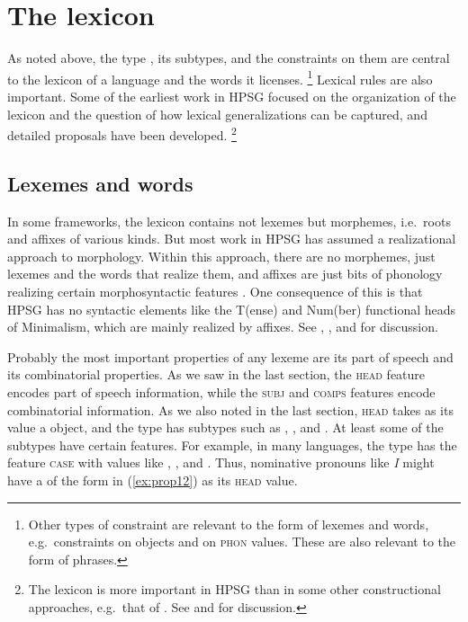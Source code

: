 \documentclass[output=paper
	        ,collection
	        ,collectionchapter
 	        ,biblatex
                ,babelshorthands
                ,newtxmath
                ,draftmode
                ,colorlinks, citecolor=brown
]{langscibook}
\begin{document}
\section{The lexicon}\label{sec:prop4}
\label{prop:sec-lexicon}

As noted above, the type , its subtypes, and the constraints on them are central to the lexicon of a language and the words it licenses.%
%
\footnote{\label{fn-constraints-synsem-phon}%
Other types of constraint are relevant to the form of lexemes and words, e.g.\ constraints on  objects and on \textsc{phon} values. These are also relevant to the form of phrases.}
%
Lexical rules are also important. Some of the earliest work in HPSG focused on the organization of the lexicon and the question of how lexical generalizations can be captured, and detailed proposals have been developed.%
%
\footnote{The lexicon is more important in HPSG than in some other constructional approaches, e.g.\ that of \citet{Goldberg95a,Goldberg2006a}. See \citet{MWArgSt} and  for discussion.}
%

\subsection{Lexemes and words}\label{sec:prop4.1}

In some frameworks, the lexicon contains not lexemes but morphemes, i.e.\ roots and affixes of various kinds. But most work in HPSG has assumed a realizational approach to morphology. Within this approach, there are no morphemes, just lexemes and the words that realize them, and affixes are just bits of phonology realizing certain morphosyntactic features \citep{Stump2001a-u-kopiert,Anderson92a-u}. One consequence of this is that HPSG has no syntactic elements like the T(ense) and Num(ber) functional heads of Minimalism\indexmp, which are mainly realized by affixes. See , , and  for discussion.

Probably the most important properties of any lexeme are its part of speech and its combinatorial properties. As we saw in the last section, the \textsc{head} feature encodes part of speech information, while the \textsc{subj} and \textsc{comps} features encode combinatorial information. As we also noted in the last section, \textsc{head} takes as its value a  object, and the type  has subtypes such as , , and . At least some of the subtypes have certain features. For example, in many languages, the type  has the feature \textsc{case} with values like , , and . Thus, nominative pronouns like \emph{I} might have a  of the form in (\ref{ex:prop12}) as its \textsc{head} value.
\end{document}
